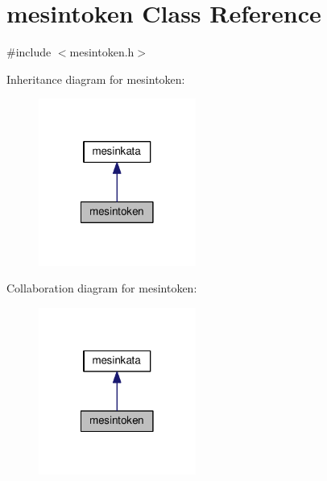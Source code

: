 \hypertarget{classmesintoken}{\section{mesintoken Class Reference}
\label{classmesintoken}
}


{\ttfamily \#include $<$mesintoken.\-h$>$}



Inheritance diagram for mesintoken\-:\nopagebreak
\begin{figure}[H]
\begin{center}
\leavevmode
\includegraphics[width=146pt]{classmesintoken__inherit__graph}
\end{center}
\end{figure}


Collaboration diagram for mesintoken\-:\nopagebreak
\begin{figure}[H]
\begin{center}
\leavevmode
\includegraphics[width=146pt]{classmesintoken__coll__graph}
\end{center}
\end{figure}
